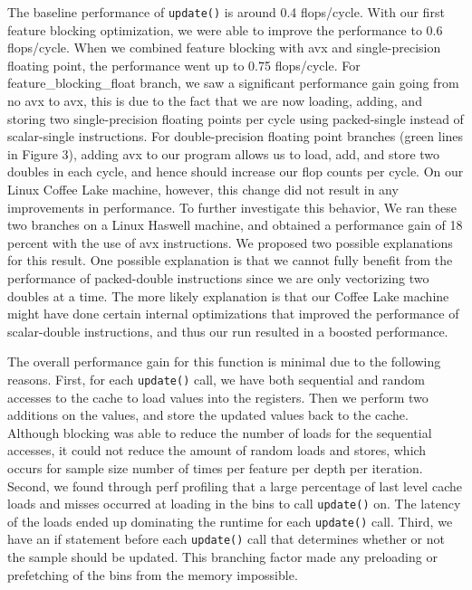 The baseline performance of \texttt{update()} is around 0.4 flops/cycle. With our first feature blocking optimization, we were able to improve the performance to 0.6 flops/cycle. When we combined feature blocking with avx and single-precision floating point, the performance went up to 0.75 flops/cycle. For feature\_blocking\_float branch, we saw a significant performance gain going from no avx to avx, this is due to the fact that we are now loading, adding, and storing two single-precision floating points per cycle using packed-single instead of scalar-single instructions. For double-precision floating point branches (green lines in Figure 3), adding avx to our program allows us to load, add, and store two doubles in each cycle, and hence should increase our flop counts per cycle. On our Linux Coffee Lake machine, however, this change did not result in any improvements in performance. To further investigate this behavior, We ran these two branches on a Linux Haswell machine, and obtained a performance gain of 18 percent with the use of avx instructions. We proposed two possible explanations for this result. One possible explanation is that we cannot fully benefit from the performance of packed-double instructions since we are only vectorizing two doubles at a time. The more likely explanation is that our Coffee Lake machine might have done certain internal optimizations that improved the performance of scalar-double instructions, and thus our run resulted in a boosted performance.

The overall performance gain for this function is minimal due to the following reasons. First, for each \texttt{update()} call, we have both sequential and random accesses to the cache to load values into the registers. Then we perform two additions on the values, and store the updated values back to the cache. Although blocking was able to reduce the number of loads for the sequential accesses, it could not reduce the amount of random loads and stores, which occurs for sample size number of times per feature per depth per iteration. Second, we found through perf profiling that a large percentage of last level cache loads and misses occurred at loading in the bins to call \texttt{update()} on. The latency of the loads ended up dominating the runtime for each \texttt{update()} call. Third, we have an if statement before each \texttt{update()} call that determines whether or not the sample should be updated. This branching factor made any preloading or prefetching of the bins from the memory impossible.

